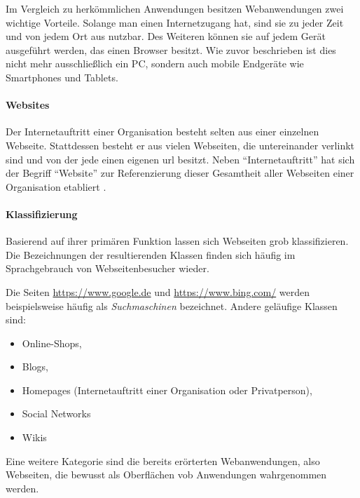             Im Vergleich zu herkömmlichen Anwendungen besitzen Webanwendungen zwei wichtige Vorteile.
            Solange man einen Internetzugang hat, sind sie zu jeder Zeit und von jedem Ort aus nutzbar.
            Des Weiteren können sie auf jedem Gerät ausgeführt werden,
            das einen Browser besitzt. Wie zuvor beschrieben ist dies nicht mehr ausschließlich ein PC,
            sondern auch mobile Endgeräte wie Smartphones und Tablets.

            \paragraph*{Websites}
            Der Internetauftritt einer Organisation besteht selten aus einer
            einzelnen Webseite.
            Stattdessen besteht er aus vielen Webseiten,
            die untereinander verlinkt sind und von der jede einen eigenen
            \gls{url} besitzt.
            Neben "`Internetauftritt"' hat sich der Begriff "`Website"' zur
            Referenzierung dieser Gesamtheit aller Webseiten einer Organisation
            etabliert \cite{duden:Internetauftritt, oxford:Website}.

            \paragraph*{Klassifizierung}
            Basierend auf ihrer primären Funktion lassen sich Webseiten grob klassifizieren.
            Die Bezeichnungen der resultierenden Klassen finden sich häufig im Sprachgebrauch
            von Webseitenbesucher wieder.

            Die Seiten \url{https://www.google.de} und \url{https://www.bing.com/}
            werden beispielsweise häufig als \textit{Suchmaschinen} bezeichnet.
            Andere geläufige Klassen sind:

            \begin{itemize}
                \item Online-Shops,
                \item Blogs,
                \item Homepages (Internetauftritt einer Organisation oder Privatperson),
                \item Social Networks
                \item Wikis
            \end{itemize}

            Eine weitere Kategorie sind die bereits erörterten Webanwendungen,
            also Webseiten, die bewusst als Oberflächen vob Anwendungen wahrgenommen werden.

